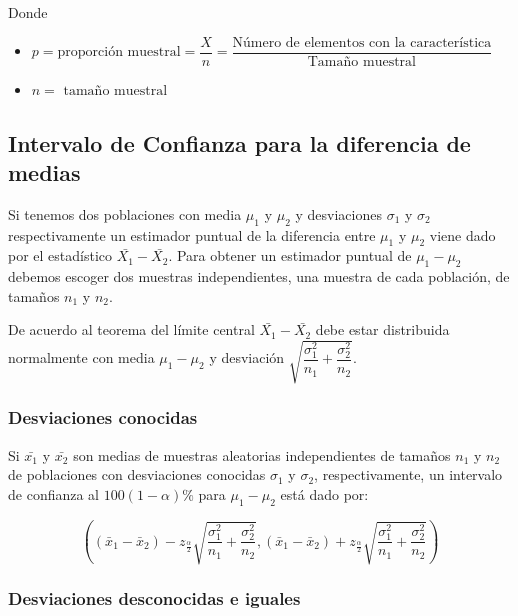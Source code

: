 \documentclass[letterpaper,]{book}
\begin{document}
Donde

\begin{itemize}
\item
  \(p=\text{proporción muestral}=\dfrac{X}{n} =\dfrac{\text{Número de elementos con la característica}}{\text{Tamaño muestral}}\)
\item
  \(n= \text{ tamaño muestral}\)
\end{itemize}

\hypertarget{intervalo-de-confianza-para-la-diferencia-de-medias}{%
\subsection{Intervalo de Confianza para la diferencia de medias}\label{intervalo-de-confianza-para-la-diferencia-de-medias}}

Si tenemos dos poblaciones con media \(\mu_1\) y \(\mu_2\) y desviaciones \(\sigma_1\) y \(\sigma_2\) respectivamente un estimador puntual de la diferencia entre \(\mu_1\) y \(\mu_2\) viene dado por el estadístico \(\bar{X_1}-\bar{X_2}\). Para obtener un estimador puntual de \(\mu_1-\mu_2\) debemos escoger dos muestras independientes, una muestra de cada población, de tamaños \(n_1\) y \(n_2\).

De acuerdo al teorema del límite central \(\bar{X_1}-\bar{X_2}\) debe estar distribuida normalmente con media \(\mu_1 - \mu_2\) y desviación \(\sqrt{\dfrac{\sigma_1^2}{n_1} + \dfrac{\sigma_2^2}{n_2}}\).

\hypertarget{desviaciones-conocidas}{%
\subsubsection{Desviaciones conocidas}\label{desviaciones-conocidas}}

Si \(\bar{x_1}\) y \(\bar{x_2}\) son medias de muestras aleatorias independientes de tamaños \(n_1\) y \(n_2\) de poblaciones con desviaciones conocidas \(\sigma_1\) y \(\sigma_2\), respectivamente, un intervalo de confianza al \(100\left(1-\alpha\right)\%\) para \(\mu_1-\mu_2\) está dado por:

\begin{equation} 
\left( \left( \bar{x}_1 - \bar{x}_2 \right) - z_{\frac{\alpha}{2}}\sqrt{\dfrac{\sigma_1^2}{n_1} + \dfrac{\sigma_2^2}{n_2}} , \left( \bar{x}_1 - \bar{x}_2 \right) + z_{\frac{\alpha}{2}}\sqrt{\dfrac{\sigma_1^2}{n_1} + \dfrac{\sigma_2^2}{n_2}} \right) 
\label{eq:ic2msc}
\end{equation}

\hypertarget{desviaciones-desconocidas-e-iguales}{%
\subsubsection{Desviaciones desconocidas e iguales}\label{desviaciones-desconocidas-e-iguales}}
\end{document}
